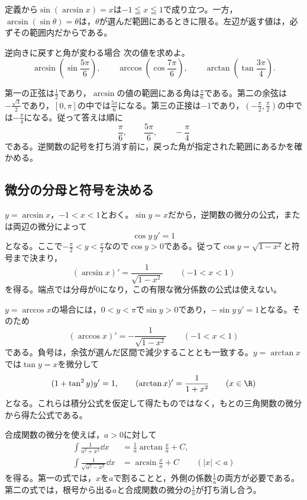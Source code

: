 定義から$\sin(\arcsin x)=x$は$-1\leqq x\leqq1$で成り立つ。一方，$\arcsin(\sin\theta)=\theta$は，$\theta$が選んだ範囲にあるときに限る。左辺が返す値は，必ずその範囲内だからである。

\begin{example}{逆向きに戻すと角が変わる場合}
次の値を求めよ。
\[
\arcsin\left(\sin\frac{5\pi}6\right),\qquad
\arccos\left(\cos\frac{7\pi}6\right),\qquad
\arctan\left(\tan\frac{3\pi}4\right).
\]
\end{example}

第一の正弦は$\frac12$であり，$\arcsin$の値の範囲にある角は$\frac\pi6$である。第二の余弦は$-\frac{\sqrt3}2$であり，$[0,\pi]$の中では$\frac{5\pi}6$になる。第三の正接は$-1$であり，$\left(-\frac\pi2,\frac\pi2\right)$の中では$-\frac\pi4$になる。従って答えは順に
\[
\frac\pi6,\qquad\frac{5\pi}6,\qquad-\frac\pi4
\]
である。逆関数の記号を打ち消す前に，戻った角が指定された範囲にあるかを確かめる。

\subsection{微分の分母と符号を決める}

$y=\arcsin x$，$-1<x<1$とおく。$\sin y=x$だから，逆関数の微分の公式，または両辺の微分によって
\[
\cos y\,y'=1
\]
となる。ここで$-\frac\pi2<y<\frac\pi2$なので$\cos y>0$である。従って$\cos y=\sqrt{1-x^2}$と符号まで決まり，
\[
(\arcsin x)'=\frac1{\sqrt{1-x^2}}\qquad(-1<x<1)
\]
を得る。端点では分母が$0$になり，この有限な微分係数の公式は使えない。

$y=\arccos x$の場合には，$0<y<\pi$で$\sin y>0$であり，$-\sin y\,y'=1$となる。そのため
\[
(\arccos x)'=-\frac1{\sqrt{1-x^2}}\qquad(-1<x<1)
\]
である。負号は，余弦が選んだ区間で減少することとも一致する。$y=\arctan x$では$\tan y=x$を微分して
\[
(1+\tan^2y)y'=1,\qquad
(\arctan x)'=\frac1{1+x^2}\qquad(x\in\R)
\]
となる。これらは積分公式を仮定して得たものではなく，もとの三角関数の微分から得た公式である。

合成関数の微分を使えば，$a>0$に対して
\begin{equation}\label{式:逆三角関数の積分}
\begin{aligned}
\int\frac1{a^2+x^2}\dd x
 &=\frac1a\arctan\frac xa+C,\\
\int\frac1{\sqrt{a^2-x^2}}\dd x
 &=\arcsin\frac xa+C\qquad(|x|<a)
\end{aligned}
\end{equation}
を得る。第一の式では，$x$を$a$で割ることと，外側の係数$\frac1a$の両方が必要である。第二の式では，根号から出る$a$と合成関数の微分の$\frac1a$が打ち消し合う。

